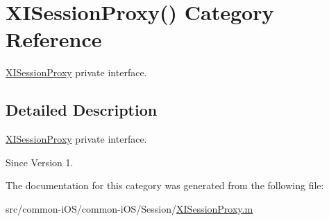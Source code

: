 \hypertarget{category_x_i_session_proxy_07_08}{}\section{X\+I\+Session\+Proxy() Category Reference}
\label{category_x_i_session_proxy_07_08}


\hyperlink{interface_x_i_session_proxy}{X\+I\+Session\+Proxy} private interface.  




\subsection{Detailed Description}
\hyperlink{interface_x_i_session_proxy}{X\+I\+Session\+Proxy} private interface. 

\begin{DoxySince}{Since}
Version 1. 
\end{DoxySince}


The documentation for this category was generated from the following file\+:\begin{DoxyCompactItemize}
\item 
src/common-\/i\+O\+S/common-\/i\+O\+S/\+Session/\hyperlink{_x_i_session_proxy_8m}{X\+I\+Session\+Proxy.\+m}\end{DoxyCompactItemize}
